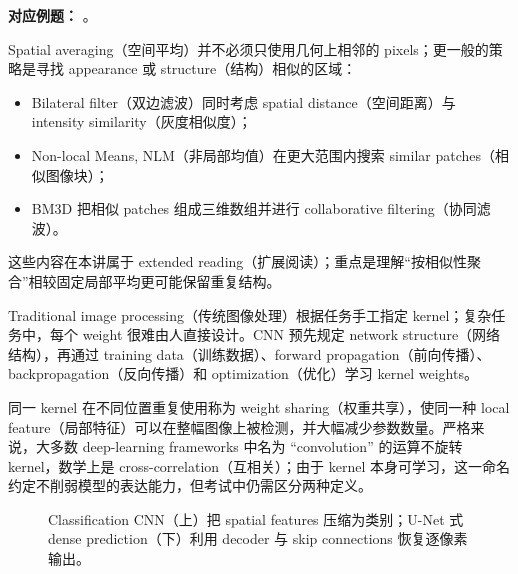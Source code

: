 \textbf{对应例题：}
。


Spatial averaging（空间平均）并不必须只使用几何上相邻的 pixels；更一般的策略是寻找 appearance 或 structure（结构）相似的区域：
\begin{itemize}
  \item Bilateral filter（双边滤波）同时考虑 spatial distance（空间距离）与 intensity similarity（灰度相似度）；
  \item Non-local Means, NLM（非局部均值）在更大范围内搜索 similar patches（相似图像块）；
  \item BM3D 把相似 patches 组成三维数组并进行 collaborative filtering（协同滤波）。
\end{itemize}
这些内容在本讲属于 extended reading（扩展阅读）；重点是理解``按相似性聚合''相较固定局部平均更可能保留重复结构。


Traditional image processing（传统图像处理）根据任务手工指定 kernel；复杂任务中，每个 weight 很难由人直接设计。CNN 预先规定 network structure（网络结构），再通过 training data（训练数据）、forward propagation（前向传播）、backpropagation（反向传播）和 optimization（优化）学习 kernel weights。

同一 kernel 在不同位置重复使用称为 weight sharing（权重共享），使同一种 local feature（局部特征）可以在整幅图像上被检测，并大幅减少参数数量。严格来说，大多数 deep-learning frameworks 中名为 ``convolution'' 的运算不旋转 kernel，数学上是 cross-correlation（互相关）；由于 kernel 本身可学习，这一命名约定不削弱模型的表达能力，但考试中仍需区分两种定义。

\begin{figure}[htbp]
  \centering
  \resizebox{0.96\textwidth}{!}{}
  \caption{Classification CNN（上）把 spatial features 压缩为类别；U-Net 式 dense prediction（下）利用 decoder 与 skip connections 恢复逐像素输出。}
  \label{fig:sc4061-l03-cnn-pipeline}
\end{figure}


